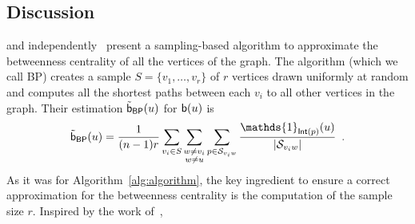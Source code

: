 \subsection{Discussion}\label{sec:centrsampldiscussion}
\citet{JacobKLPT05} and independently~\citet{BrandesP07} present a
sampling-based algorithm to approximate the betweenness centrality of all the
vertices of the graph. The algorithm (which we call \textsf{BP}) creates a
sample $S=\{v_1,\dotsc,v_r\}$ of $r$ vertices drawn uniformly at random and
computes all the shortest paths between each $v_i$ to all other vertices in the
graph. Their estimation $\tilde{\mathsf{b}}_\mathsf{BP}(u)$ for $\mathsf{b}(u)$ is
\[ 
\tilde\betw_\mathsf{BP}(u)= \frac{1}{(n-1)r}\sum_{v_i\in S}\sum_{\substack{w\neq
v_i\\w\neq
u}}\sum_{p\in\mathcal{S}_{v_iw}}\frac{\mathds{1}_{\mathsf{Int}(p)}(u)}{|\mathcal{S}_{v_iw}|}\enspace.
\]
As it was for Algorithm~\ref{alg:algorithm}, the key ingredient to ensure a correct
approximation for the betweenness centrality is the computation of the sample
size $r$. Inspired by the work of~\citet{EppsteinW04}, \citet{BrandesP07} 
%
